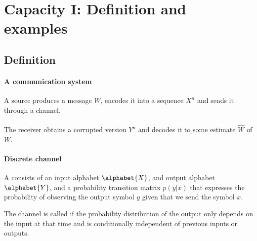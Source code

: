 \documentclass[a4paper, 11pt, openany]{book}
\begin{document}
    \section{Capacity I: Definition and examples}
    \label{sec:33}




    \subsection{Definition}

    \paragraph{A communication system}
    A source produces a message $W$, encodes it into a sequence $X^n$ and sends it through a channel.\\
    ~\\
    The receiver obtains a corrupted version $Y^n$ and decodes it to some estimate $\hat{W}$ of $W$.

    \begin{center}
    \end{center}





    \paragraph{Discrete channel}


    A  consists of an input alphabet $\alphabet{X}$, and output alphabet $\alphabet{Y}$, and a probability transition matrix $p(y | x)$ that expresses the probability of observing the output symbol $y$ given that we send the symbol $x$.

    The channel is called  if the probability distribution of the output only depends on the input at that time and is conditionally independent of previous inputs or outputs.
\end{document}
